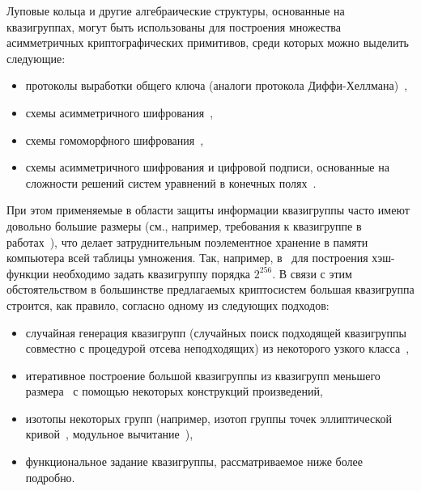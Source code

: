    Луповые кольца и другие алгебраические структуры, основанные на квазигруппах, могут быть использованы для построения множества асимметричных криптографических примитивов, среди которых можно выделить следующие:
    \begin{itemize}
        \item протоколы выработки общего ключа (аналоги протокола Диффи-Хеллмана)~\cite{DH14, DH16, baryshnikov2017key, quantum18},
        \item схемы асимметричного шифрования~\cite{markov12, pke10, gribovphd},
        \item схемы гомоморфного шифрования~\cite{homomo15, gribovphd, katyshev2020application, markov20},
        \item схемы асимметричного шифрования и цифровой подписи, основанные на сложности решений систем уравнений в конечных полях~\cite{gligoroski2008public, gligoroski2008multivariate, chen2010multivariate, gligoroski2011mqq}.
    \end{itemize}

    При этом применяемые в области защиты информации квазигруппы часто имеют довольно большие размеры (см., например, требования к квазигруппе в работах~\cite{EdonR, EdonRprime, chen2010multivariate}), что делает затруднительным поэлементное хранение в памяти компьютера всей таблицы умножения. 
    Так, например, в~\cite{EdonRprime} для построения хэш-функции необходимо задать квазигруппу порядка $2^{256}$. 
    В связи с этим обстоятельством в большинстве предлагаемых криптосистем большая квазигруппа строится, как правило, согласно одному из следующих подходов:
    \begin{itemize}
        \item случайная генерация квазигрупп (случайных поиск подходящей квазигруппы совместно с процедурой отсева неподходящих) из некоторого узкого класса~\cite{gligoroski2008public, chen2010multivariate},
        \item итеративное построение большой квазигруппы из квазигрупп меньшего размера~\cite{EdonRprime, gribovphd} с помощью некоторых конструкций произведений,
        \item изотопы некоторых  групп (например, изотоп группы точек эллиптической кривой~\cite{DH16}, модульное вычитание~\cite{snavsel2009hash}),
        \item функциональное задание квазигруппы, рассматриваемое ниже более подробно.
    \end{itemize}


